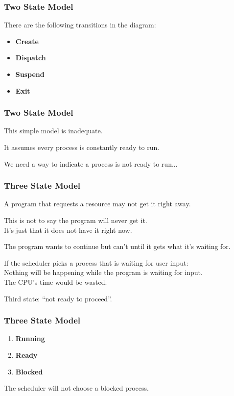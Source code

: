\begin{frame}
\frametitle{Two State Model}

There are the following transitions in the diagram:
\begin{itemize}
	\item \textbf{Create}
	\item \textbf{Dispatch}
	\item \textbf{Suspend}
	\item \textbf{Exit}
\end{itemize}

\end{frame}

\begin{frame}
\frametitle{Two State Model}
This simple model is inadequate.

It assumes every process is constantly ready to run.

We need a way to indicate a process is not ready to run...

\end{frame}

\begin{frame}
\frametitle{Three State Model}

A program that requests a resource may not get it right away. 

This is not to say the program will never get it.\\
\quad It's just that it does not have it right now. 

The program wants to continue but can't until it gets what it's waiting for. 

If the scheduler picks a process that is waiting for user input:\\
\quad Nothing will be happening while the program is waiting for input.\\
\quad The CPU's time would be wasted. 

Third state: ``not ready to proceed''.


\end{frame}

\begin{frame}
\frametitle{Three State Model}

\begin{enumerate}
 \item \textbf{Running}
 \item \textbf{Ready}
 \item \textbf{Blocked}
\end{enumerate}

The scheduler will not choose a blocked process.

\end{frame}

